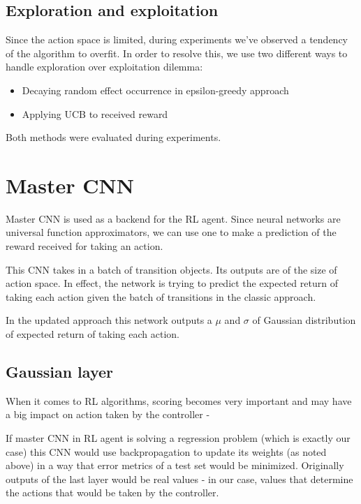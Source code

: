 \subsection{Exploration and exploitation}

Since the action space is limited, during experiments we've observed a tendency of the algorithm to overfit. In order to resolve this, we use two different ways to handle exploration over exploitation dilemma:

\begin{itemize}
\item Decaying random effect occurrence in epsilon-greedy approach 
\item Applying UCB to received reward
\end{itemize}

Both methods were evaluated during experiments.

\section{Master CNN}

Master CNN is used as a backend for the RL agent. Since neural networks are universal function approximators, we can use one to make a prediction of the reward received for taking an action.

This CNN takes in a batch of transition objects. Its outputs are of the size of action space. In effect, the network is trying to predict the expected return of taking each action given the batch of transitions in the classic approach.

In the updated approach this network outputs a $\mu$ and $\sigma$ of Gaussian distribution of expected return of taking each action.

\subsection{Gaussian layer}

When it comes to RL algorithms, scoring becomes very important and may have a big impact on action taken by the controller - \cite[see][]{tilmann}

If master CNN in RL agent is solving a regression problem (which is exactly our case) this CNN would use backpropagation to update its weights (as noted above) in a way that error metrics of a test set would be minimized. Originally outputs of the last layer would be real values - in our case, values that determine the actions that would be taken by the controller.

